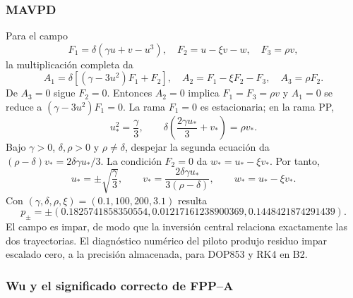 \subsubsection{MAVPD}

Para el campo
\begin{equation}
 F_1=\delta(\gamma u+v-u^3),\quad
 F_2=u-\xi v-w,\quad F_3=\rho v,
 \label{pilot:eq-mavpd-field}
\end{equation}
la multiplicación completa da
\begin{equation}
 A_1=\delta[(\gamma-3u^2)F_1+F_2],\quad
 A_2=F_1-\xi F_2-F_3,
 \quad A_3=\rho F_2.
 \label{pilot:eq-mavpd-acceleration}
\end{equation}
De $A_3=0$ sigue $F_2=0$. Entonces $A_2=0$ implica $F_1=F_3=\rho v$ y
$A_1=0$ se reduce a
$(\gamma-3u^2)F_1=0$. La rama $F_1=0$ es estacionaria; en la rama PP,
\begin{equation}
 u_*^2=\frac\gamma3,\qquad
 \delta\left(\frac{2\gamma u_*}{3}+v_*\right)=\rho v_*.
\end{equation}
Bajo \(\gamma>0\), \(\delta,\rho>0\) y \(\rho\ne\delta\), despejar la
segunda ecuación da \((\rho-\delta)v_*=2\delta\gamma u_*/3\). La condición
\(F_2=0\) da \(w_*=u_*-\xi v_*\). Por tanto,
\begin{equation}
 u_*=\pm\sqrt{\frac\gamma3},\qquad
 v_*=\frac{2\delta\gamma u_*}{3(\rho-\delta)},
 \qquad w_*=u_*-\xi v_*.
 \label{pilot:eq-mavpd-pp-derived}
\end{equation}
Con $(\gamma,\delta,\rho,\xi)=(0.1,100,200,3.1)$ resulta
\begin{equation}
 p_\pm=\pm(0.1825741858350554,
 0.01217161238900369,0.1448421874291439).
 \label{pilot:eq-mavpd-pp-numeric}
\end{equation}
El campo es impar, de modo que la inversión central relaciona exactamente las
dos trayectorias. El diagnóstico numérico del piloto produjo residuo impar
escalado cero, a la precisión almacenada, para DOP853 y RK4 en B2.

\subsubsection{Wu y el significado correcto de FPP--A}

